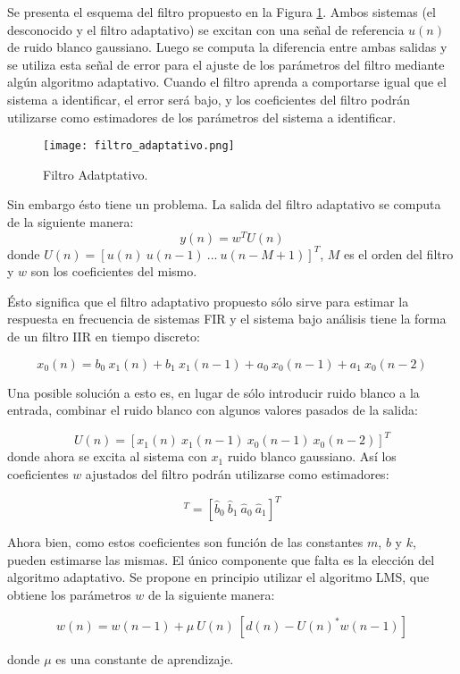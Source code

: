 
	Se presenta el esquema del filtro propuesto en la Figura \ref{fig:filtro_adaptativo}. 
	Ambos sistemas (el desconocido y el filtro adaptativo) se excitan con una señal de referencia $u(n)$ de ruido blanco gaussiano.
	Luego se computa la diferencia entre ambas salidas y se utiliza esta señal de error para el ajuste de los parámetros del filtro mediante algún algoritmo adaptativo.
	Cuando el filtro aprenda a comportarse igual que el sistema a identificar, el error será bajo, y los coeficientes del filtro podrán utilizarse como estimadores de los parámetros del sistema a identificar.

\vspace*{\fill}
\begin{figure}[H]
\centering
\texttt{[image: filtro\_adaptativo.png]}
\caption{Filtro Adatptativo.}
\label{fig:filtro_adaptativo} 
\end{figure}
\vspace*{\fill}

Sin embargo ésto tiene un problema. La salida del filtro adaptativo se computa de la siguiente manera:
\begin{equation*}
	y(n) = w^T U(n)
\end{equation*}
donde $U(n) = [u(n) \> u(n - 1) \> ... \> u(n - M + 1)]^T$, $M$ es el orden del filtro y $w$ son los coeficientes del mismo.

	Ésto significa que el filtro adaptativo propuesto sólo sirve para estimar la respuesta en frecuencia de sistemas FIR y el sistema bajo análisis tiene la forma de un filtro IIR en tiempo discreto:

\begin{equation*}
		x_{0}(n) = b_{0} \> x_{1}(n) + b_{1} \> x_{1}(n - 1) + a_{0} \> x_{0}(n - 1) + a_{1} \> x_{0}(n - 2)
\end{equation*}

Una posible solución a esto es, en lugar de sólo introducir ruido blanco a la entrada, combinar el ruido blanco con algunos valores pasados de la salida:

\begin{equation*}
	U(n) = [x_{1}(n) \> x_{1}(n - 1) \> x_{0}(n - 1) \> x_{0}(n - 2)]^T
\end{equation*}
donde ahora se excita al sistema con $x_{1}$ ruido blanco gaussiano. Así los coeficientes $w$ ajustados del filtro podrán utilizarse como estimadores:

\begin{equation*}
	[w_{0} \> w_{1} \> w_{2} \> w_{3}]^T  = [\hat{b}_{0} \> \hat{b}_{1} \> \hat{a}_{0} \> \hat{a}_{1}]^T
\end{equation*}

Ahora bien, como estos coeficientes son función de las constantes $m$, $b$ y $k$, pueden estimarse las mismas. El único componente que falta es la elección del algoritmo adaptativo. Se propone en principio utilizar el algoritmo LMS, que obtiene los parámetros $w$ de la siguiente manera:

\begin{equation*}
	w(n) = w(n - 1) + \mu \> U(n) \> [d(n) - U(n)^* w(n - 1)]
\end{equation*}

donde $\mu$ es una constante de aprendizaje.
